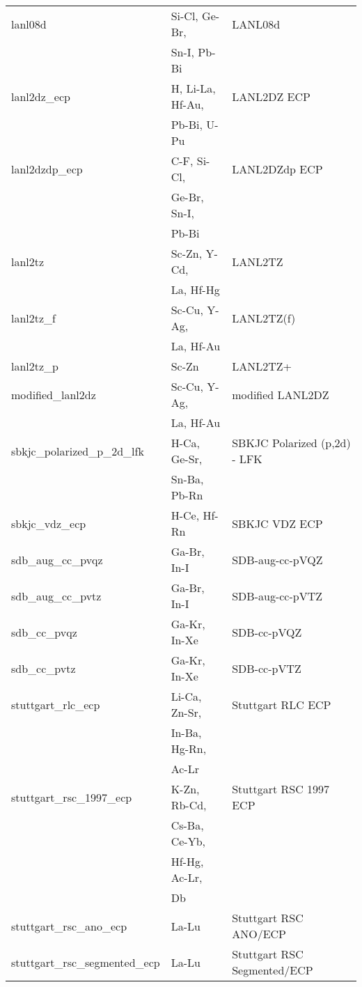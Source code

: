 \begin{longtable}{lll}
lanl08d & Si-Cl, Ge-Br, & LANL08d\\
        & Sn-I, Pb-Bi &\\
lanl2dz\_ecp & H, Li-La, Hf-Au, & LANL2DZ ECP\\
             & Pb-Bi, U-Pu &\\
lanl2dzdp\_ecp & C-F, Si-Cl, & LANL2DZdp ECP\\
               & Ge-Br, Sn-I, &\\
               & Pb-Bi &\\
lanl2tz & Sc-Zn, Y-Cd, & LANL2TZ\\
        & La, Hf-Hg &\\
lanl2tz\_f & Sc-Cu, Y-Ag, & LANL2TZ(f)\\
           & La, Hf-Au &\\
lanl2tz\_p & Sc-Zn & LANL2TZ+\\
modified\_lanl2dz & Sc-Cu, Y-Ag, & modified LANL2DZ\\
                  & La, Hf-Au &\\
sbkjc\_polarized\_p\_2d\_lfk & H-Ca, Ge-Sr, & SBKJC Polarized (p,2d) - LFK\\
                             & Sn-Ba, Pb-Rn &\\
sbkjc\_vdz\_ecp & H-Ce, Hf-Rn & SBKJC VDZ ECP\\
sdb\_aug\_cc\_pvqz & Ga-Br, In-I & SDB-aug-cc-pVQZ\\
sdb\_aug\_cc\_pvtz & Ga-Br, In-I  & SDB-aug-cc-pVTZ\\
sdb\_cc\_pvqz & Ga-Kr, In-Xe & SDB-cc-pVQZ\\
sdb\_cc\_pvtz & Ga-Kr, In-Xe & SDB-cc-pVTZ\\
stuttgart\_rlc\_ecp & Li-Ca, Zn-Sr, & Stuttgart RLC ECP\\
                    & In-Ba, Hg-Rn, &\\
                    & Ac-Lr &\\
stuttgart\_rsc\_1997\_ecp & K-Zn, Rb-Cd, & Stuttgart RSC 1997 ECP\\
                          & Cs-Ba, Ce-Yb, &\\
                          & Hf-Hg, Ac-Lr, &\\
                          & Db &\\
stuttgart\_rsc\_ano\_ecp & La-Lu & Stuttgart RSC ANO/ECP\\
stuttgart\_rsc\_segmented\_ecp & La-Lu & Stuttgart RSC Segmented/ECP\\
\hline
\end{longtable}

